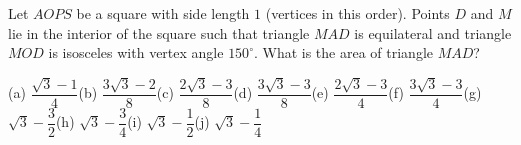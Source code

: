 Let $AOPS$ be a square with side length $1$ (vertices in this order). Points $D$ and $M$ lie in the interior of the square such that triangle $MAD$ is equilateral and triangle $MOD$ is isosceles with vertex angle $150^\circ$. What is the area of triangle $MAD$?

(a) $\dfrac{\sqrt3-1}{4}$\quad (b) $\dfrac{3\sqrt3-2}{8}$\quad (c) $\dfrac{2\sqrt3-3}{8}$\quad (d) $\dfrac{3\sqrt3-3}{8}$\quad (e) $\dfrac{2\sqrt3-3}{4}$\quad (f) $\dfrac{3\sqrt3-3}{4}$\quad (g) $\sqrt3-\dfrac{3}{2}$\quad (h) $\sqrt3-\dfrac{3}{4}$\quad (i) $\sqrt3-\dfrac{1}{2}$\quad (j) $\sqrt3-\dfrac{1}{4}$
